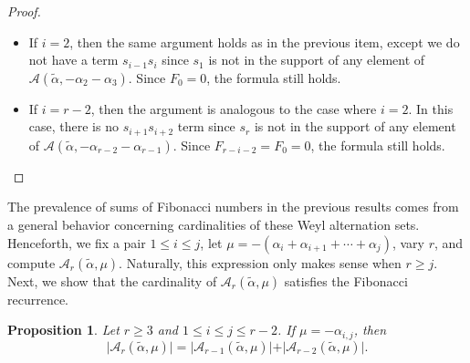 \documentclass{amsart}
\newtheorem{proposition}[theorem]{Proposition}
\theoremstyle{definition}
\newcommand{\hroot}{\tilde{\alpha}}
\newcommand{\calA}{\mathcal{A}}
\begin{document}
\begin{proof}
\begin{itemize}
The sets of elements considered in cases (2), (3), and (5) have the same cardinality. 
In particular, the elements in each case are in bijection with the number of ways to select nonconsecutive indices from $\{2,3,\ldots,i-2\} \cup \{i+3,i+4,\ldots,r-1\}$, so that {there are} $F_{i-1}F_{r-i-1}$ such elements.
Hence, we have in total over these three cases $3F_{i-1}F_{r-i-1}$ elements in the Weyl alternation set.
Similarly, the number of elements considered in case (1) is given by $F_{i-2}F_{r-i}$; the number of elements considered in case (4) is given by $F_{i}F_{r-i-2}$; and,
the number of elements considered in (6) is given by $F_{r}$.

Therefore,
\[|\calA_r(\hroot,-\alpha_i-\alpha_{i+1})|=3F_{i-1}F_{r-i-1}+F_{i-2}F_{r-i}+F_{i}F_{r-i-2}+F_{r}.\]
\item If $i = 2$, then the same argument holds as in the previous item, except we do not have a term $s_{i-1}s_i$ since $s_1$ is not in the support of any element of $\mathcal{A}(\hroot, -\alpha_2 -\alpha_3)$. Since $F_{0} = 0$,
the formula still holds.

\item If $i = r-2$, then the argument is analogous to the case where $i=2$. In this case, there is no $s_{i+1}s_{i+2}$ term since $s_r$ is not in the support of any element of $\mathcal A(\hroot, -\alpha_{r-2}-\alpha_{r-1})$. Since $F_{r-i-2}=F_0=0$, the formula still holds. \qedhere
\end{itemize}
\end{proof}


 The prevalence of sums of Fibonacci numbers in the previous results comes from a general behavior concerning cardinalities of these Weyl alternation sets.
  Henceforth, we fix a pair $1 \leq i \leq j$, let $\mu=-(\alpha_i + \alpha_{i+1} + \cdots + \alpha_j)$, vary $r$, and compute $\mathcal{A}_r(\hroot, \mu)$. 
 Naturally, this expression only makes sense when $r \geq j$. Next, we show that the cardinality of $\mathcal{A}_r(\hroot,\mu)$ satisfies the Fibonacci recurrence.

\begin{proposition}\label{prop:RecurrenceOnSizesFixedRoot}
Let $r\geq 3$ and 
 $1 \leq i \leq j \leq r-2 $. If $\mu = -\alpha_{i,j}$, 
then
\[
\vert \mathcal{A}_r(\hroot, \mu) \vert = \vert \mathcal{A}_{r-1}(\hroot, \mu) \vert  + \vert \mathcal{A}_{r-2}(\hroot, \mu) \vert. 
\]
\end{proposition}
\end{document}
